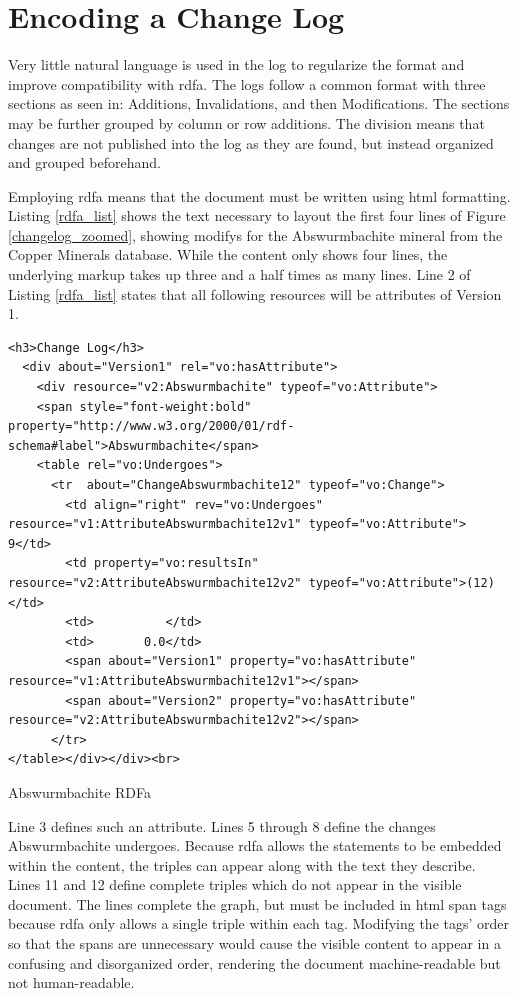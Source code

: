 \section{Encoding a Change Log}

Very little natural language is used in the \gls{log} to regularize the format and improve compatibility with \gls{rdfa}.
The \glspl{log} follow a common format with three sections as seen in: Additions, Invalidations, and then Modifications.
The sections may be further grouped by column or row additions.
The division means that \glspl{change} are not published into the \gls{log} as they are found, but instead organized and grouped beforehand.

Employing \gls{rdfa} means that the document must be written using \gls{html} formatting.
Listing \ref{rdfa_list} shows the text necessary to layout the first four lines of Figure \ref{changelog_zoomed}, showing \glspl{modify} for the Abswurmbachite mineral from the Copper Minerals database.
While the content only shows four lines, the underlying markup takes up three and a half times as many lines.
Line 2 of Listing \ref{rdfa_list} states that all following resources will be \glspl{attribute} of Version 1.
\begin{listing}
	\begin{verbatim}
<h3>Change Log</h3>
  <div about="Version1" rel="vo:hasAttribute">
    <div resource="v2:Abswurmbachite" typeof="vo:Attribute">
    <span style="font-weight:bold" property="http://www.w3.org/2000/01/rdf-schema#label">Abswurmbachite</span>
    <table rel="vo:Undergoes">
      <tr  about="ChangeAbswurmbachite12" typeof="vo:Change">
        <td align="right" rev="vo:Undergoes" resource="v1:AttributeAbswurmbachite12v1" typeof="vo:Attribute"> 9</td>
        <td property="vo:resultsIn" resource="v2:AttributeAbswurmbachite12v2" typeof="vo:Attribute">(12)</td>
        <td>          </td>
        <td>       0.0</td>
        <span about="Version1" property="vo:hasAttribute" resource="v1:AttributeAbswurmbachite12v1"></span>
        <span about="Version2" property="vo:hasAttribute" resource="v2:AttributeAbswurmbachite12v2"></span>
      </tr>
</table></div></div><br>
	\end{verbatim}
	\caption{Abswurmbachite RDFa\label{rdfa_list}}
\end{listing}
Line 3 defines such an \gls{attribute}.
Lines 5 through 8 define the \glspl{change} Abswurmbachite undergoes.
Because \gls{rdfa} allows the statements to be embedded within the content, the triples can appear along with the text they describe.
Lines 11 and 12 define complete triples which do not appear in the visible document.
The lines complete the graph, but must be included in \gls{html} span tags because \gls{rdfa} only allows a single triple within each tag.
Modifying the tags' order so that the spans are unnecessary would cause the visible content to appear in a confusing and disorganized order, rendering the document machine-readable but not human-readable.


